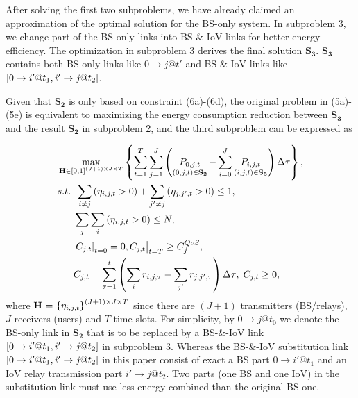 \documentclass{ieeeaccess}
\begin{document}
After solving the first two subproblems, we have already claimed an approximation of the optimal solution for the BS-only system. 
In subproblem 3, we change part of the BS-only links into BS-\&-IoV links for better energy efficiency. The optimization in subproblem 3 derives the final solution ${{\mathbf{S}}_{\mathbf{3}}}$. ${{\mathbf{S}}_{\mathbf{3}}}$ contains both BS-only links like $0 \to j@t'$ and BS-\&-IoV links like $\left[ {{\rm{0}} \to i'@{t_1},i' \to j@{t_2}} \right]$.

Given that ${{\mathbf{S}}_{\mathbf{2}}}$ is only based on constraint (6a)-(6d), the original problem in (5a)-(5e) is equivalent to maximizing the energy consumption reduction between ${{\mathbf{S}}_{\mathbf{3}}}$ and the result ${{\mathbf{S}}_{\mathbf{2}}}$ in subproblem 2, and the third subproblem can be expressed as

\begin{subequations}
\begin{align}
& \mathop {\max }\limits_{{\mathbf{{\rm H}}} \in {{\left[ {0,1} \right]}^{\left( {J + 1} \right) \times J \times T}}} \left\{ {\sum\limits_{t = 1}^T {\sum\limits_{j = 1}^J {\left( {\mathop {{P_{0,j,t}}}\limits_{\left( {0,j,t} \right) \in {{\mathbf{S}}_{\mathbf{2}}}}  - \sum\limits_{i = 0}^J {\mathop {{P_{i,j,t}}}\limits_{\left( {i,j,t} \right) \in {{\mathbf{S}}_{\mathbf{3}}}} } } \right)\Delta \tau } } } \right\}, \\
& {s.t.} \;\; \sum\limits_{i \ne j} {\left( {{\eta _{i,j,t}} > 0} \right)}  + \sum\limits_{j' \ne j} {\left( {{\eta _{j,j',t}} > 0} \right) \le {1}}, \\
& \;\;\;\;\;\; \sum\limits_j {\sum\limits_i {\left( {{\eta _{i,j,t}} > 0} \right)} }  \le N, \\
& \;\;\;\;\;\; {\left. {{{\left. {{C_{j,t}}} \right|}_{t = 0}} = 0, {C_{j,t}}} \right|_{t = T}} \ge C_j^{QoS}, \\
& \;\;\;\;\;\; {C_{j,t}} = \sum\limits_{\tau  = 1}^t {\left( {\sum\limits_i {{r_{i,j,\tau }}}  - \sum\limits_{j'} {{r_{j,j',\tau }}} } \right)\Delta \tau } ,\; {C_{j,t}} \ge 0,
\end{align}
\end{subequations}
where ${\mathbf{{\rm H}}}{\text{ = }}{\left\{ {{\eta _{i,j,t}}} \right\}^{\left( {J + 1} \right) \times J \times T}}$ since 
there are $\left( {J + 1} \right)$ transmitters (BS/relays), $J$ receivers (users) and $T$ time slots. For simplicity, by $0 \to j@{t_0}$ we denote the BS-only link in ${{\mathbf{S}}_{\mathbf{2}}}$ that is to be replaced by a BS-\&-IoV link $\left[ {{\rm{0}} \to i'@{t_1},i' \to j@{t_2}} \right]$ in subproblem 3. Whereas the BS-\&-IoV substitution link $\left[ {{\rm{0}} \to i'@{t_1},i' \to j@{t_2}} \right]$ in this paper consist of exact a BS part $0 \to i'@{t_1}$ and an IoV relay transmission part $i' \to j@{t_2}$. Two parts (one BS and one IoV) in the substitution link must use less energy combined than the original BS one.
\end{document}
